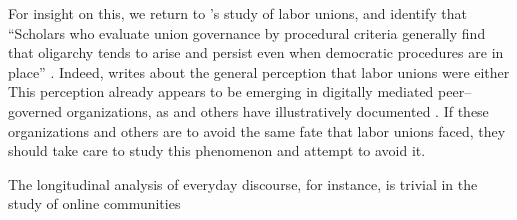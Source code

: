 \documentclass[trackingWork]{subfiles}
\begin{document}
For insight on this, we return to \citeyear{levi2009union}'s study of labor unions,
and identify that
``Scholars who evaluate union governance by procedural criteria generally find that oligarchy tends to arise and persist even when democratic procedures are in place''
\cite{levi2009union}.
Indeed, \citeauthor{levi2009union} writes about the general perception that labor unions were either
This perception already appears to be emerging in digitally mediated peer--governed organizations,
as \citeauthor{keegan2010egalitarians} and others have illustratively documented
\cite{beschastnikh2008wikipedian,keegan2010egalitarians}.
If these organizations and others are to avoid the same fate that labor unions faced,
they should take care to study this phenomenon and attempt to avoid it.


\subsubsubsection{\whatchanged}
The longitudinal analysis of everyday discourse, for instance,
is trivial in the study of online communities


\subsubsubsection{\implication}



\onlyinsubfile{
\printbibliography
}
\end{document}
